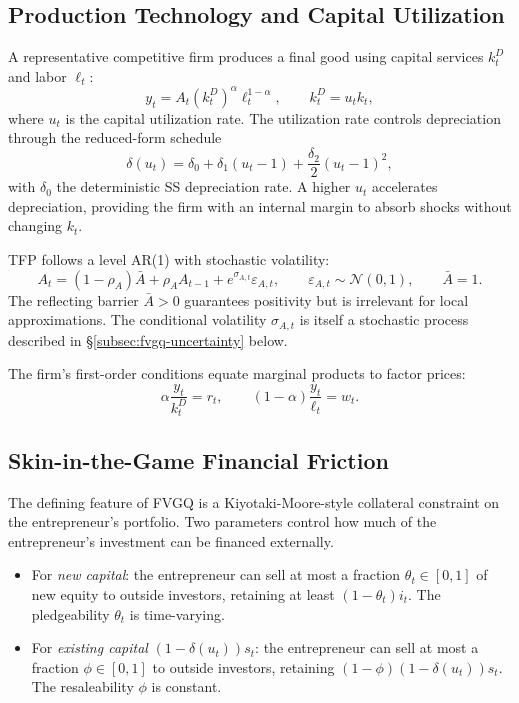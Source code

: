 \documentclass[11pt]{article}
\newcommand{\mc}[1]{\mathcal{#1}}
\newcommand{\sigA}{\sigma_{A,t}}
\theoremstyle{plain}
\theoremstyle{definition}
\begin{document}
\subsection{Production Technology and Capital Utilization}

A representative competitive firm produces a final good using capital services
$k_t^D$ and labor $\ell_t$:
\begin{equation}
y_t = A_t (k_t^D)^\alpha \ell_t^{1-\alpha},
\qquad
k_t^D = u_t k_t,
\tag{Y-FVGQ}
\end{equation}
where $u_t$ is the capital utilization rate. The utilization rate controls
depreciation through the reduced-form schedule
\begin{equation}
\delta(u_t) = \delta_0 + \delta_1 (u_t-1) + \frac{\delta_2}{2} (u_t-1)^2,
\tag{Dep-FVGQ}
\end{equation}
with $\delta_0$ the deterministic SS depreciation rate. A higher $u_t$
accelerates depreciation, providing the firm with an internal margin to absorb
shocks without changing $k_t$.

TFP follows a level AR(1) with stochastic volatility:
\begin{equation}
A_t = (1-\rho_A) \bar A + \rho_A A_{t-1} + e^{\sigA} \varepsilon_{A,t},
\qquad
\varepsilon_{A,t} \sim \mc{N}(0,1),
\qquad
\bar A = 1.
\tag{A-FVGQ}
\end{equation}
The reflecting barrier $\bar A>0$ guarantees positivity but is irrelevant for
local approximations. The conditional volatility $\sigA$ is itself a stochastic
process described in §\ref{subsec:fvgq-uncertainty} below.

The firm's first-order conditions equate marginal products to factor prices:
\[
\alpha \frac{y_t}{k_t^D} = r_t,
\qquad
(1-\alpha) \frac{y_t}{\ell_t} = w_t.
\]

\subsection{Skin-in-the-Game Financial Friction}

The defining feature of FVGQ is a Kiyotaki-Moore-style collateral constraint
on the entrepreneur's portfolio. Two parameters control how much of the
entrepreneur's investment can be financed externally.
\begin{itemize}
  \item For \emph{new capital}: the entrepreneur can sell at most a fraction
  $\theta_t \in [0,1]$ of new equity to outside investors, retaining at least
  $(1-\theta_t) i_t$. The pledgeability $\theta_t$ is time-varying.

  \item For \emph{existing capital} $(1-\delta(u_t)) s_t$: the entrepreneur
  can sell at most a fraction $\phi \in [0,1]$ to outside investors, retaining
  $(1-\phi) (1-\delta(u_t)) s_t$. The resaleability $\phi$ is constant.
\end{itemize}
\end{document}
